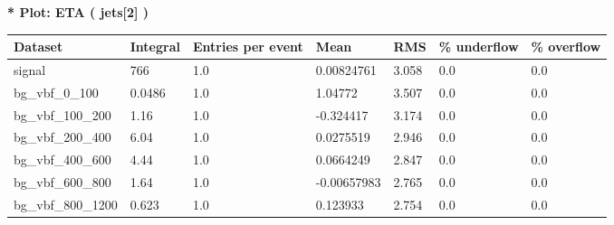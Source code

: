 \documentclass[a4paper, 10pt]{article}
\begin{document}
\textbf{* Plot: ETA ( jets[2] ) }\\
   \begin{table}[H]
  \begin{center}
    \begin{tabular}{|m{23.0mm}|m{23.0mm}|m{18.0mm}|m{19.0mm}|m{19.0mm}|m{19.0mm}|m{19.0mm}|}
      \hline
      {\cellcolor{yellow}         Dataset}& {\cellcolor{yellow}         Integral}& {\cellcolor{yellow}         Entries per event}& {\cellcolor{yellow}         Mean}& {\cellcolor{yellow}         RMS}& {\cellcolor{yellow}         \% underflow}& {\cellcolor{yellow}         \% overflow}\\
      \hline
      {\cellcolor{white}         signal}& {\cellcolor{white}         766}& {\cellcolor{white}         1.0}& {\cellcolor{white}         0.00824761}& {\cellcolor{white}         3.058}& {\cellcolor{green}         0.0}& {\cellcolor{green}         0.0}\\
      \hline
      {\cellcolor{white}         bg\_vbf\_0\_100}& {\cellcolor{white}         0.0486}& {\cellcolor{white}         1.0}& {\cellcolor{white}         1.04772}& {\cellcolor{white}         3.507}& {\cellcolor{green}         0.0}& {\cellcolor{green}         0.0}\\
      \hline
      {\cellcolor{white}         bg\_vbf\_100\_200}& {\cellcolor{white}         1.16}& {\cellcolor{white}         1.0}& {\cellcolor{white}         -0.324417}& {\cellcolor{white}         3.174}& {\cellcolor{green}         0.0}& {\cellcolor{green}         0.0}\\
      \hline
      {\cellcolor{white}         bg\_vbf\_200\_400}& {\cellcolor{white}         6.04}& {\cellcolor{white}         1.0}& {\cellcolor{white}         0.0275519}& {\cellcolor{white}         2.946}& {\cellcolor{green}         0.0}& {\cellcolor{green}         0.0}\\
      \hline
      {\cellcolor{white}         bg\_vbf\_400\_600}& {\cellcolor{white}         4.44}& {\cellcolor{white}         1.0}& {\cellcolor{white}         0.0664249}& {\cellcolor{white}         2.847}& {\cellcolor{green}         0.0}& {\cellcolor{green}         0.0}\\
      \hline
      {\cellcolor{white}         bg\_vbf\_600\_800}& {\cellcolor{white}         1.64}& {\cellcolor{white}         1.0}& {\cellcolor{white}         -0.00657983}& {\cellcolor{white}         2.765}& {\cellcolor{green}         0.0}& {\cellcolor{green}         0.0}\\
      \hline
      {\cellcolor{white}         bg\_vbf\_800\_1200}& {\cellcolor{white}         0.623}& {\cellcolor{white}         1.0}& {\cellcolor{white}         0.123933}& {\cellcolor{white}         2.754}& {\cellcolor{green}         0.0}& {\cellcolor{green}         0.0}\\

\end{tabular}
\end{center}
\end{table}
\end{document}
